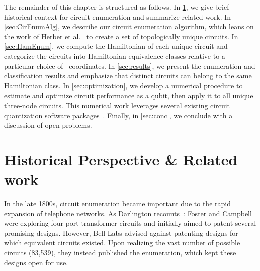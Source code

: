 The remainder of this chapter is structured as follows. In \cref{sec:History}, we give brief historical context for circuit enumeration and summarize related work. In \cref{sec:CirEnumAlg}, we describe our circuit enumeration algorithm, which leans on the work of Herber et al.~\cite{Herber:2017aa, herber:2017ab, herber_enhancements_2020} to create a set of topologically unique circuits. In \cref{sec:HamEnum}, we compute the Hamiltonian of each unique circuit and categorize the circuits into Hamiltonian equivalence classes relative to a particular choice of \canonical\ coordinates.
In \cref{sec:results}, we present the enumeration and classification results and emphasize that distinct circuits can belong to the same Hamiltonian class.
In \cref{sec:optimization}, we develop a numerical procedure to estimate and optimize circuit performance as a qubit, then apply it to all unique three-node circuits.
This numerical work leverages several existing circuit quantization software packages~\cite{groszkowskiScqubitsPythonPackage2021a,chittaComputeraidedQuantizationNumerical2022a,kqcircuits,gelyQuCATQuantumCircuit2020,aumannCircuitQOpensourceToolbox2022,rajabzadehAnalysisArbitrarySuperconducting2023,rajabzadehGeneralFrameworkGradientBased2024, Tanamoto_2023}. Finally, in \cref{sec:conc}, we conclude with a discussion of open problems.

\section{Historical Perspective \& Related work}\label{sec:History}

In the late 1800s, circuit enumeration became important due to the rapid expansion of telephone networks.
As Darlington recounts~\cite{Darlington:1984aa}:
Foster and Campbell~\cite{Campbell:1920aa} were exploring four-port transformer circuits and initially aimed to patent several promising designs. However, Bell Labs advised against patenting designs for which equivalent circuits existed. Upon realizing the vast number of possible circuits (83,539), they instead published the enumeration, which kept these designs open for use.

